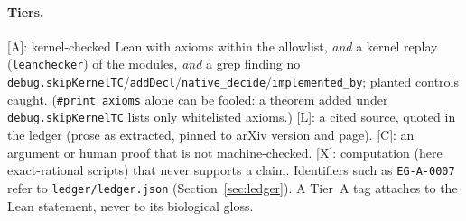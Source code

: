 \documentclass[11pt]{article}
\newcommand{\tier}[1]{\textsf{[#1]}}
\begin{document}
\paragraph{Tiers.} \tier{A}: kernel-checked Lean with axioms within the allowlist, \emph{and} a kernel replay (\texttt{leanchecker}) of the modules, \emph{and} a grep finding no \texttt{debug.skipKernelTC}/\texttt{addDecl}/\texttt{native\_decide}/\texttt{implemented\_by}; planted controls caught. (\texttt{\#print axioms} alone can be fooled: a theorem added under \texttt{debug.skipKernelTC} lists only whitelisted axioms.) \tier{L}: a cited source, quoted in the ledger
(prose as extracted, pinned to arXiv version and page). \tier{C}: an argument or human proof that is not machine-checked. \tier{X}: computation (here exact-rational scripts) that never supports a claim.
Identifiers such as \texttt{EG-A-0007} refer to \texttt{ledger/ledger.json} (Section~\ref{sec:ledger}). A Tier~A tag attaches to the Lean statement, never to its biological gloss.

\end{document}
